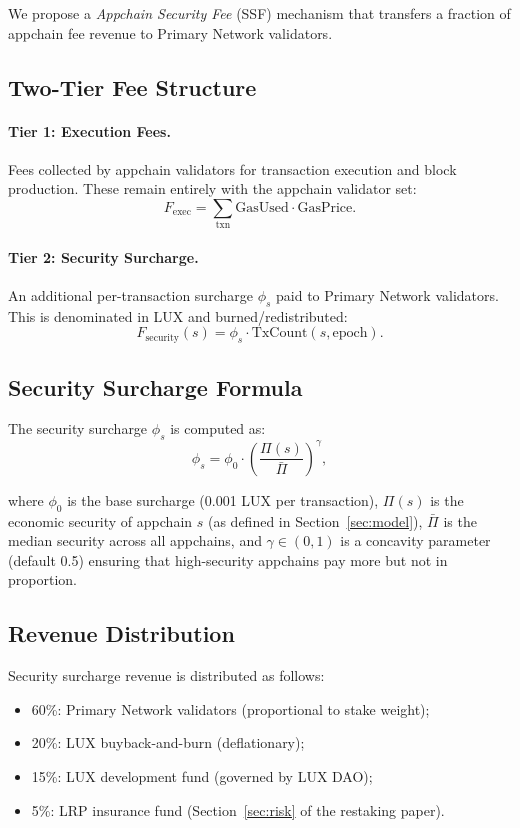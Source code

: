 \documentclass[11pt]{article}
\begin{document}
We propose a \emph{Appchain Security Fee} (SSF) mechanism that transfers a fraction of
appchain fee revenue to Primary Network validators.

\subsection{Two-Tier Fee Structure}

\paragraph{Tier 1: Execution Fees.}
Fees collected by appchain validators for transaction execution and block production.
These remain entirely with the appchain validator set:
\[
  F_{\text{exec}} = \sum_{\text{txn}} \text{GasUsed} \cdot \text{GasPrice}.
\]

\paragraph{Tier 2: Security Surcharge.}
An additional per-transaction surcharge $\phi_s$ paid to Primary Network validators.
This is denominated in LUX and burned/redistributed:
\[
  F_{\text{security}}(s) = \phi_s \cdot \text{TxCount}(s, \text{epoch}).
\]

\subsection{Security Surcharge Formula}

The security surcharge $\phi_s$ is computed as:
\begin{equation}
  \phi_s = \phi_0 \cdot \left(\frac{\Pi(s)}{\bar{\Pi}}\right)^\gamma,
  \label{eq:surcharge}
\end{equation}

where $\phi_0$ is the base surcharge (0.001 LUX per transaction), $\Pi(s)$ is the economic
security of appchain $s$ (as defined in Section~\ref{sec:model}), $\bar{\Pi}$ is the median
security across all appchains, and $\gamma \in (0,1)$ is a concavity parameter (default 0.5)
ensuring that high-security appchains pay more but not in proportion.

\subsection{Revenue Distribution}

Security surcharge revenue is distributed as follows:

\begin{itemize}[leftmargin=1.5em]
  \item 60\%: Primary Network validators (proportional to stake weight);
  \item 20\%: LUX buyback-and-burn (deflationary);
  \item 15\%: LUX development fund (governed by LUX DAO);
  \item 5\%: LRP insurance fund (Section~\ref{sec:risk} of the restaking paper).
\end{itemize}
\end{document}
